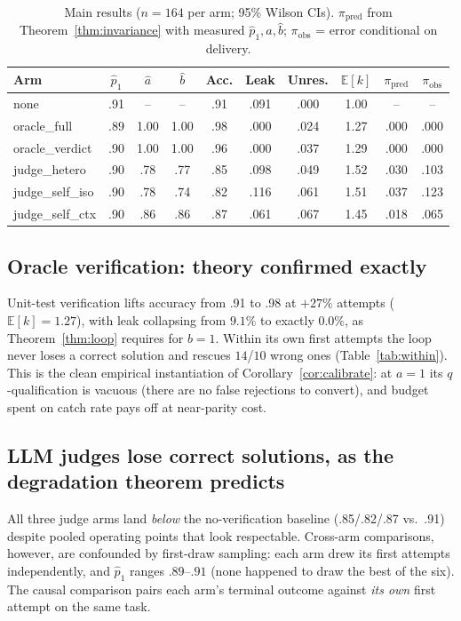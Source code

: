 \documentclass[11pt]{article}
\begin{document}
\begin{table}[t]
\centering\small
\caption{Main results ($n{=}164$ per arm; 95\% Wilson CIs).
$\pi_{\mathrm{pred}}$ from Theorem~\ref{thm:invariance} with
measured $\hat p_1,\hat a,\hat b$;
$\pi_{\mathrm{obs}}$ = error conditional on delivery.}
\label{tab:main}
\begin{tabular}{lccccccccc}
\toprule
Arm & $\hat p_1$ & $\hat a$ & $\hat b$ & Acc. & Leak &
Unres. & $\mathbb{E}[k]$ & $\pi_{\mathrm{pred}}$ &
$\pi_{\mathrm{obs}}$\\
\midrule
none            & .91 & --   & --   & .91 & .091 & .000 & 1.00 & --   & --\\
oracle\_full    & .89 & 1.00 & 1.00 & .98 & .000 & .024 & 1.27 & .000 & .000\\
oracle\_verdict & .90 & 1.00 & 1.00 & .96 & .000 & .037 & 1.29 & .000 & .000\\
judge\_hetero   & .90 & .78  & .77  & .85 & .098 & .049 & 1.52 & .030 & .103\\
judge\_self\_iso& .90 & .78  & .74  & .82 & .116 & .061 & 1.51 & .037 & .123\\
judge\_self\_ctx& .90 & .86  & .86  & .87 & .061 & .067 & 1.45 & .018 & .065\\
\bottomrule
\end{tabular}
\end{table}

\subsection{Oracle verification: theory confirmed exactly}
Unit-test verification lifts accuracy from .91 to .98 at $+27\%$
attempts ($\mathbb{E}[k]=1.27$), with leak collapsing from $9.1\%$
to exactly $0.0\%$, as Theorem~\ref{thm:loop} requires for $b=1$.
Within its own first attempts the loop never loses a correct
solution and rescues $14$/$10$ wrong ones
(Table~\ref{tab:within}).  This is the clean empirical instantiation
of Corollary~\ref{cor:calibrate}: at $a = 1$ its $q$-qualification
is vacuous (there are no false rejections to convert), and budget
spent on catch rate pays off at near-parity cost.

\subsection{LLM judges lose correct solutions, as the degradation
theorem predicts}
All three judge arms land \emph{below} the no-verification baseline
(.85/.82/.87 vs.\ .91) despite pooled operating points that look
respectable.  Cross-arm comparisons, however, are confounded by
first-draw sampling: each arm drew its first attempts independently,
and $\hat p_1$ ranges $.89$--$.91$ (\textsf{none} happened to draw
the best of the six).  The causal comparison pairs each arm's
terminal outcome against \emph{its own} first attempt on the same
task.
\end{document}
